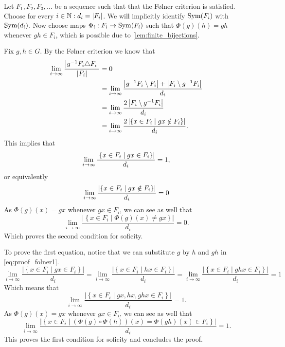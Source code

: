 Let $F_1, F_2, F_3, \dots $ be a sequence such that that the Følner criterion is satisfied.
Choose for every $i \in \mathbb{N}: d_i = |F_i|$. We will implicitly identify $\operatorname{Sym}(F_i)$ with $\operatorname{Sym}(d_i)$. Now choose maps $\Phi_i: F_i \to \operatorname{Sym}(F_i)$ such that $\Phi(g)(h) = gh$ whenever $gh \in F_i$, which is possible due to \cref{lem:finite_bijections}. 

Fix $g, h \in G$. By the Følner criterion we know that 
\begin{align*}
    \lim_{i\to \infty} \frac{\left| g^{-1}F_i \triangle F_i \right|}{\left| F_i \right|} &= 0\\
    &= \lim_{i\to \infty} \frac{\left| g^{-1}F_i \setminus F_i \right| + \left| F_i \setminus g^{-1}F_i \right|}{d_i}\\
    &= \lim_{i\to \infty} \frac{2\left|  F_i \setminus g^{-1}F_i  \right|}{d_i}\\
    &= \lim_{i\to \infty} \frac{2\left| \left\{ x \in F_i \mid gx \notin F_i \right\} \right|}{d_i}. 
\end{align*}
This implies that \begin{equation}
    \lim_{i\to \infty} \frac{\left| \left\{ x \in F_i \mid gx \in F_i \right\} \right|}{d_i} = 1,
\end{equation}
or equivalently 
\begin{equation}\label{eq:proof_folner1}
    \lim_{i\to \infty} \frac{\left| \left\{ x \in F_i \mid gx \notin F_i \right\} \right|}{d_i} = 0
\end{equation}
As $\Phi(g)(x) = gx$ whenever $gx \in F_i$, we can see as well that 
$$\lim_{i\to \infty} \frac{\left|\left\{ x \in F_i \mid \Phi(g)(x)\ne gx \right\}\right|}{d_i} = 0.$$
Which proves the second condition for soficity. 

To prove the first equation, notice that we can substitute $g$ by $h$ and $gh$ in \cref{eq:proof_folner1}.
$$ \lim_{i\to \infty} \frac{\left|\left\{ x \in F_i \mid gx \in F_i \right\}\right|}{d_i} =
\lim_{i\to \infty} \frac{\left|\left\{ x \in F_i \mid hx \in F_i \right\}\right|}{d_i} =
\lim_{i\to \infty} \frac{\left|\left\{ x \in F_i \mid ghx \in F_i \right\}\right|}{d_i}= 1$$
Which means that 
$$\lim_{i\to \infty} \frac{\left|\left\{ x \in F_i \mid gx,hx,ghx \in F_i \right\}\right|}{d_i}= 1.$$
As $\Phi(g)(x) = gx$ whenever $gx \in F_i$, we can see as well that
$$\lim_{i\to \infty} \frac{\left|\left\{ x \in F_i \mid (\Phi(g) \circ\Phi(h))(x) = \Phi(gh)(x) \in F_i \right\}\right|}{d_i}= 1.$$
This proves the first condition for soficity and concludes the proof. 
